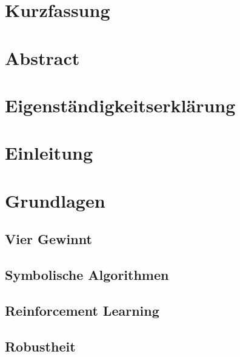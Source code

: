\documentclass[a4paper, 12pt]{scrartcl}
\begin{document}
    \renewcommand{\figurename}{Abb.}
	\fancyhf{}
	
	\newpage
	
	\section{Kurzfassung}
	
	
	\section{Abstract}
	
	
	\tableofcontents
	\newpage

    \listoffigures
    \newpage

    \section*{Eigenständigkeitserklärung}
	
	\newpage
 
	\setcounter{page}{1}
	\fancyfoot[C]{\thepage}
	
	\section{Einleitung}
	
	
	\section{Grundlagen}
    
    
    \subsection{Vier Gewinnt}
    
    
	\subsection{Symbolische Algorithmen}
	

	\subsection{Reinforcement Learning}
	

	\subsection{Robustheit}\label{sec:robustheit}
	
	
\end{document}
